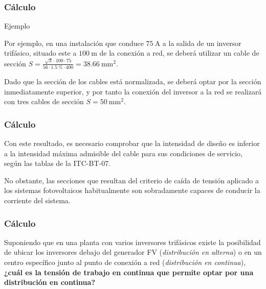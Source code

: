 \documentclass[serif, xcolor=dvipsnames]{beamer}
\begin{document}
\begin{frame}
  \frametitle{Cálculo}
  \begin{block} {Ejemplo}

    Por ejemplo, en una instalación que conduce $\SI{75}{\ampere}$ a
    la salida de un inversor trifásico, situado este a
    $\SI{100}{\meter}$ de la conexión a red, se deberá utilizar un
    cable de sección
    $S=\frac{\sqrt{3}\cdot100\cdot75}{56\cdot\SI{1.5}{\percent}\cdot400}=\SI{38.66}{\milli\meter\squared}$.

    Dado que la sección de los cables está normalizada, se deberá
    optar por la sección inmediatamente superior, y por tanto la
    conexión del inversor a la red se realizará con tres cables de
    sección $S=\SI{50}{\milli\meter\squared}$.

  \end{block}

\end{frame}
\begin{frame}
  \frametitle{Cálculo}
  \begin{block} {}

    Con este resultado, es necesario comprobar que la intensidad de
    diseño es inferior a la intensidad máxima admisible del cable para
    sus condiciones de servicio, según las tablas de la ITC-BT-07.

    No obstante, las secciones que resultan del criterio de caída de
    tensión aplicado a los sistemas fotovoltaicos habitualmente son
    sobradamente capaces de conducir la corriente del sistema.

  \end{block}

\end{frame}
\begin{frame}
  \frametitle{Cálculo}

  Suponiendo que en una planta con varios inversores trifásicos existe
  la posibilidad de ubicar los inversores debajo del generador FV
  (\emph{distribución en alterna}) o en un centro específico junto al
  punto de conexión a red (\emph{distribución en continua}),
  \textbf{¿cuál es la tensión de trabajo en continua que permite optar
    por una distribución en continua?}


\end{frame}
\end{document}
